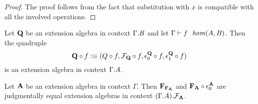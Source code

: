 \begin{proof}
The proof follows from the fact that substitution with $x$ is compatible with
all the involved operations.
\end{proof}

\begin{cor}
Let $\mathbf{Q}$ be an extension algebra in context $\ctxext{\Gamma}{B}$
and let $\jhom{\Gamma}{A}{B}{f}$. Then the quadruple
\begin{equation*}
\jcomp{A}{f}{\extalg{Q}}
  \defeq
  (\jcomp{A}{f}{\cftalgc{\cftalg{Q}}},\jcomp{A}{f}{\cftalgf{\cftalg{Q}}},\jcomp{A}{f}{\cftctxext[\cftalg{Q}]},\jcomp{A}{f}{\cftfamext[\cftalg{Q}]})
\end{equation*}
is an extension algebra in context $\ctxext{\Gamma}{A}$.
\end{cor}

\begin{cor}
Let $\mathbf{A}$ be an extension algebra in context $\Gamma$. Then
$\mathbf{F_{F_A}}$ and $\jcomp{}{\cftctxext[\extalg{A}]}{\extalg{F_A}}$ are
judgmentally equal extension algebras in context $\ctxext{{\Gamma}{\cftalgc{\cftalg{A}}}}{\cftalgf{\cftalg{A}}}$.
\end{cor}

